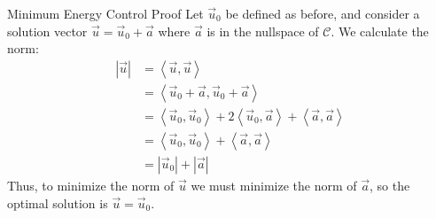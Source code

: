 \begin{frame}{Minimum Energy Control Proof}
	Let $\vec{u}_0$ be defined as before, and consider a solution vector $\vec{u} = \vec{u}_0 + \vec{a}$ where $\vec{a}$ is in the nullspace of $\mathscr{C}$. We calculate the norm:
	\begin{align*}
	\left| \vec{u} \right| 
	& = \left< \vec{u}, \vec{u} \right> 
	\\ &= \left< \vec{u}_0 + \vec{a}, \vec{u}_0 + \vec{a} \right> 
	\\ &= \left< \vec{u}_0, \vec{u}_0 \right>  + 2\left< \vec{u}_0, \vec{a} \right>  + \left< \vec{a}, \vec{a} \right> 
	\\ &= \left< \vec{u}_0, \vec{u}_0 \right>  + \left< \vec{a}, \vec{a} \right> 
	\\ &= \left| \vec{u}_0 \right| + \left| \vec{a} \right| 
	\end{align*}
	Thus, to minimize the norm of $\vec{u}$ we must minimize the norm of $\vec{a}$, so the optimal solution is $\vec{u} = \vec{u}_0$.
\end{frame}